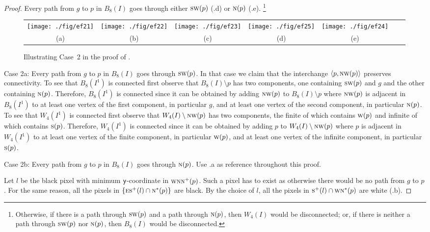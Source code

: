 \documentclass[lotsofwhite,charterfonts]{patmorin}
\newcommand{\N}{\textsc{n}}
\newcommand{\E}{\textsc{e}}
\renewcommand{\S}{\textsc{s}}
\newcommand{\SW}{\textsc{sw}}
\newcommand{\W}{\textsc{w}}
\newcommand{\NW}{\textsc{nw}}
\newcommand{\y}{\ensuremath{\protect\textup{\textsf{y}}}}
\newcommand{\ic}[2]{\langle #1,#2 \rangle}
\newcommand{\sm}{\ensuremath{\setminus}}
\begin{document}
\begin{proof}
Every path from $g$ to $p$ in $B_8(I)$ goes through  either $\SW(p)$ (.d)  or $\N(p)$ (.e). \footnote{Otherwise, if there is a path through $\SW(p)$ and a path through $\N(p)$, then $W_4(I)$ would be disconnected; or, if there is neither a path through $\SW(p)$ nor $\N(p)$, then $B_8(I)$ would be disconnected.}


\begin{figure}[htbp]
\begin{center}
\begin{tabular}{ccccccc}
\texttt{[image: ./fig/ef21]} & 
\texttt{[image: ./fig/ef22]} & 
\texttt{[image: ./fig/ef23]} & 
\texttt{[image: ./fig/ef25]} & 
\texttt{[image: ./fig/ef24]} 
\\
(a) & (b) & (c) & (d) & (e)
\end{tabular}
\end{center}
\caption{Illustrating Case~2 in the proof of .}
\end{figure}


\noindent Case 2a: Every path from $g$ to $p$ in $B_8(I)$ goes through $\SW(p)$.  In that case we claim that the interchange $\ic{p}{\NW(p)}$ preserves connectivity. To see that $B_8(I^1)$ is connected first observe that $B_8(I)\sm p$ has two components, one containing $\SW(p)$ and $g$ and the other containing $\N(p)$. Therefore, $B_8(I^1)$ is connected since it can be obtained by adding $\NW(p)$ to $B_8(I)\sm p$ where $\NW(p)$ is adjacent in $B_8(I^1)$ to at least one vertex of the first component, in particular $g$, and at least one vertex of the second component, in particular $\N(p)$. To see that $W_4(I^1)$ is connected first observe that $W_4(I)\sm \NW(p)$ has two components, the finite of which contains $\W(p)$ and infinite of which contains $\S(p)$. Therefore, $W_4(I^1)$ is connected since it can be obtained by adding $p$ to $W_4(I)\sm \NW(p)$ where $p$ is adjacent in $W_4(I^1)$ to at least one vertex of the finite component, in particular $\W(p)$, and at least one vertex of the infinite component, in particular $\S(p)$.



\noindent Case 2b: Every path from $g$ to $p$ in $B_8(I)$ goes through $\N(p)$. Use .a as reference throughout this proof. 

Let $l$ be the black pixel with minimum \y-coordinate in $\W\N\N^+(p)$. Such a pixel has to exist as otherwise there would be no path from $g$ to $p$. For the same reason, all the pixels in $\{\E\S^+(l) \cap \N^*(p)\}$ are black. By the choice of $l$, all the pixels in $\S^+(l) \cap \W\N^*(p)$ are white (.b). 


\end{proof}
\end{document}
